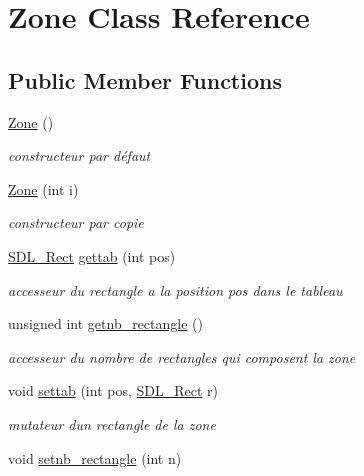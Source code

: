 \hypertarget{class_zone}{}\section{Zone Class Reference}
\label{class_zone}
\subsection*{Public Member Functions}
\begin{DoxyCompactItemize}
\item 
\mbox{\label{class_zone_a37c9721c0d592a7a231f4e6dbae93277}} 
\hyperlink{class_zone_a37c9721c0d592a7a231f4e6dbae93277}{Zone} ()
\begin{DoxyCompactList}\small\item\em constructeur par défaut \end{DoxyCompactList}\item 
\hyperlink{class_zone_ac28e36a038ec6cb04ca2fdda3c5de592}{Zone} (int i)
\begin{DoxyCompactList}\small\item\em constructeur par copie \end{DoxyCompactList}\item 
\hyperlink{struct_s_d_l___rect}{S\+D\+L\+\_\+\+Rect} \hyperlink{class_zone_aa040a486aee97a63701e15b185c5b91f}{gettab} (int pos)
\begin{DoxyCompactList}\small\item\em accesseur du rectangle a la position pos dans le tableau \end{DoxyCompactList}\item 
unsigned int \hyperlink{class_zone_a3b912f09ced97f72f772b82934ea298a}{getnb\+\_\+rectangle} ()
\begin{DoxyCompactList}\small\item\em accesseur du nombre de rectangles qui composent la zone \end{DoxyCompactList}\item 
void \hyperlink{class_zone_a26eac0fb6a0564237b4798cbba78eee7}{settab} (int pos, \hyperlink{struct_s_d_l___rect}{S\+D\+L\+\_\+\+Rect} r)
\begin{DoxyCompactList}\small\item\em mutateur d\textquotesingle{}un rectangle de la zone \end{DoxyCompactList}\item 
void \hyperlink{class_zone_a42a69a501d277a5e32f7a76484e7a63f}{setnb\+\_\+rectangle} (int n)

\end{DoxyCompactItemize}
